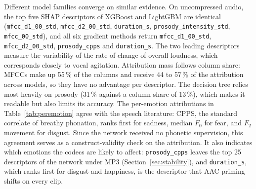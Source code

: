 \documentclass[lettersize,journal]{IEEEtran}
\newcommand{\ttf}[1]{\texttt{\footnotesize #1}}
\begin{document}
Different model families converge on similar evidence. On uncompressed audio,
the top five SHAP
descriptors of XGBoost and LightGBM are identical (\ttf{mfcc\_d1\_00\_std},
\ttf{mfcc\_d2\_00\_std}, \ttf{duration\_s}, \ttf{prosody\_intensity\_std},
\ttf{mfcc\_00\_std}), and all six gradient methods return
\ttf{mfcc\_d1\_00\_std}, \ttf{mfcc\_d2\_00\_std}, \ttf{prosody\_cpps} and
\ttf{duration\_s}. The two leading descriptors measure the variability of the
rate of change of overall loudness, which corresponds closely to vocal
agitation. Attribution mass follows column share: MFCCs make up 55\,\% of the
columns and receive 44 to 57\,\% of the attribution across models, so they have
no advantage per descriptor. The decision tree relies most heavily on prosody
(31\,\% against a column share of 13\,\%), which makes it readable but also
limits its accuracy. The per-emotion attributions in
Table~\ref{tab:peremotion} agree with the speech literature: CPPS, the standard
correlate of breathy phonation, ranks first for sadness, median $F_0$ for fear,
and $F_2$ movement for disgust. Since the network received no phonetic
supervision, this agreement serves as a construct-validity check on the
attribution. It also indicates which emotions the codecs are likely to affect:
\ttf{prosody\_cpps} leaves the top 25 descriptors of the network under MP3
(Section~\ref{sec:stability}), and \ttf{duration\_s}, which ranks first for
disgust and happiness, is the descriptor that AAC priming shifts on every
clip.
\end{document}
